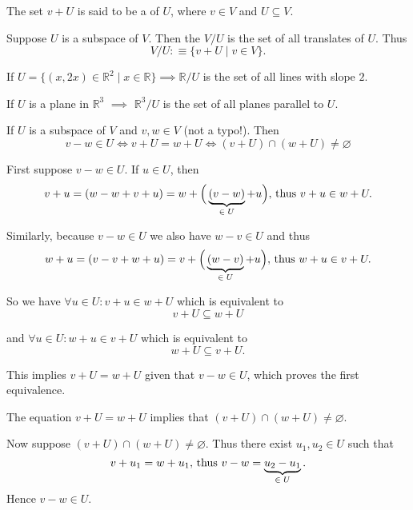 \setcounter{thm}{96}
\begin{mydef} [translate]
  The set $v+U$ is said to be a  of $U$, where $v\in V$ and $U \subseteq V$.
\end{mydef}

\setcounter{thm}{98}
\begin{mydef} 
  Suppose $U$ is a subspace of $V$. Then the  $V/U$ is the set of all translates of $U$. Thus
  \begin{equation}
    V/U :\equiv \{v+U \mid v\in V\}.
  \end{equation}
\end{mydef}

\begin{example}
  If $U=\{ (x,2x)\in \mathbb{R}^2 \mid x\in \mathbb{R} \} \implies \mathbb{R}/U$ is the set of all lines with slope $2$.

  If $U$ is a plane in $\mathbb{R}^3$ $\implies$ $\mathbb{R}^3/U$ is the set of all planes parallel to $U$.
\end{example}

\begin{thm} 
  \label{thm: two translates of a subspace are equal or disjoint}
  If $ U $ is a subspace of $V$ and $v,w\in V$ (not a typo!). Then
  \begin{equation}
    v-w \in U \iff v+U = w + U \iff (v+U)\cap (w+U) \neq \varnothing
  \end{equation}
\end{thm}
\begin{prf}
   First suppose $v-w\in U$. If $u \in U$, then
  \[
    v+u = (w - w + v + u) = w + \Big( \underbrace{(v-w)}_{\in \; U} + u\Big), $ thus $ v+u \in w+U.
  \]

  Similarly, because $v-w \in U$ we also have $w-v \in U$ and thus
  \[
    w+u = (v - v + w + u) = v+\Big( \underbrace{(w-v)}_{\in \; U}+u \Big), $ thus $ w+u \in v+U.
  \]

  So we have $\forall u \in U: v+u \in w+U$ which is equivalent to \[ v+U \subseteq w + U\]

  and $\forall u \in U: w+u \in v+U$ which is equivalent to \[ w+U \subseteq v+U.\]

  This implies $v+U = w+U$ given that $v-w \in U$, which proves the first equivalence.

   The equation $v+U = w+U$ implies that $(v+U) \cap (w+U) \neq \varnothing$.

   Now suppose $(v+U) \cap (w+U) \neq \varnothing$. Thus there exist $u_1, u_2 \in U$ such that
  \[
    v+u_1 = w+u_1, $ thus $ v-w = \underbrace{u_2-u_1}_{\in \; U}.
  \]
  Hence $v-w \in U$.
\end{prf}


